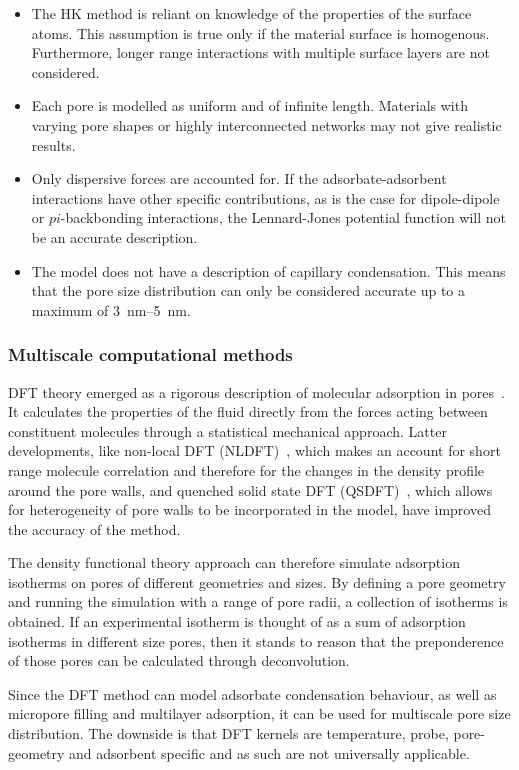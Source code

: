 \begin{itemize}

	\item The HK method is reliant on knowledge of the properties of
	      the surface atoms. This assumption is true only if the
	      material surface is homogenous. Furthermore,
	      longer range interactions with multiple surface layers are
	      not considered.
	\item Each pore is modelled as uniform and of infinite length.
	      Materials with varying pore shapes or highly interconnected
	      networks may not give realistic results.
	\item Only dispersive forces are accounted for.
	      If the adsorbate-adsorbent interactions
	      have other specific contributions, as is the case
	      for dipole-dipole or \(pi\)-backbonding interactions,
	      the Lennard-Jones potential function will not be
	      an accurate description.
	\item The model does not have a description of capillary condensation.
	      This means that the pore size distribution can only
	      be considered accurate up to a maximum of
	      \SIrange{3}{5}{\nano\metre}.

\end{itemize}

\subsubsection{Multiscale computational methods}

DFT theory emerged as a rigorous description of molecular
adsorption in pores~\cite{seatonNewAnalysisMethod1989}.
It calculates the properties of the fluid
directly from the forces acting between constituent molecules
through a statistical mechanical approach. Latter developments,
like non-local DFT (NLDFT)~\cite{tarazonaPhaseEquilibriaFluid1987},
which makes an account for short range molecule correlation
and therefore for the changes in the density profile
around the pore walls, and quenched solid state DFT
(QSDFT)~\cite{neimarkQuenchedSolidDensity2009}, which allows for
heterogeneity of pore walls to be incorporated in the model,
have improved the accuracy of the method.

The density functional theory approach can therefore simulate
adsorption isotherms on pores of different geometries and sizes.
By defining a pore geometry and running the simulation with a
range of pore radii, a collection of isotherms is obtained.
If an experimental isotherm is thought of as a sum of
adsorption isotherms in different size pores, then it stands
to reason that the preponderence of those pores can be calculated
through deconvolution.

Since the DFT method can model adsorbate condensation behaviour,
as well as micropore filling and multilayer adsorption, it can
be used for multiscale pore size distribution. The downside is
that DFT kernels are temperature, probe, pore-geometry and
adsorbent specific and as such are not universally applicable.
